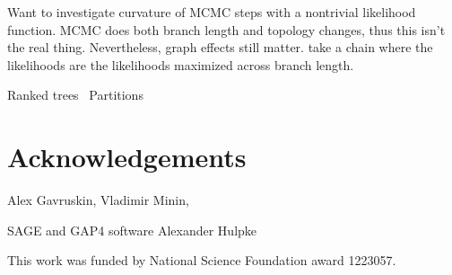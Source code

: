 \documentclass[11pt,onecolumn,conference]{IEEEtran}
\begin{document}
Want to investigate curvature of MCMC steps with a nontrivial likelihood function.
MCMC does both branch length and topology changes, thus this isn't the real thing.
Nevertheless, graph effects still matter.
\cite{Stefankovic2011-hu} take a chain where the likelihoods are the likelihoods maximized across branch length.

Ranked trees~\cite{Song2006-xe}
Partitions~\cite{Gusfield2002-il}


\section{Acknowledgements}
Alex Gavruskin,
Vladimir Minin,

SAGE and GAP4 software
Alexander Hulpke

This work was funded by National Science Foundation award 1223057.

\pagebreak



\end{document}
